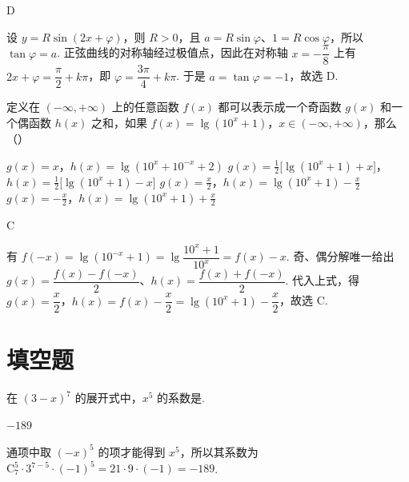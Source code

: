 \begin{answer}
D
\end{answer}

\begin{solution}
设 \(y=R\sin(2x+\varphi)\)，则 \(R>0\)，且 \(a=R\sin\varphi\)、\(1=R\cos\varphi\)，所以 \(\tan\varphi=a\). 正弦曲线的对称轴经过极值点，因此在对称轴 \(x=-\dfrac\pi8\) 上有 \(2x+\varphi=\dfrac\pi2+k\pi\)，即 \(\varphi=\dfrac{3\pi}{4}+k\pi\). 于是 \(a=\tan\varphi=-1\)，故选 D.
\end{solution}

\begin{problem}
定义在 \((- \infty, + \infty)\) 上的任意函数 \(f(x)\) 都可以表示成一个奇函数 \(g(x)\) 和一个偶函数 \(h(x)\) 之和，如果 \(f(x) = \lg (10^{x} + 1)\)，\(x \in (-\infty, +\infty)\)，那么（\quad）

\choices
    {\(g(x) = x\)，\(h(x) = \lg (10^{x} + 10^{-x} + 2)\)}
    {\(g(x) = \frac{1}{2}\bigl[\lg (10^{x} + 1) + x\bigr]\)，\(h(x) = \frac{1}{2}\bigl[\lg (10^{x} + 1) - x\bigr]\)}
    {\(g(x) = \frac{x}{2}\)，\(h(x) = \lg (10^x + 1) - \frac{x}{2}\)}
    {\(g(x) = -\frac{x}{2}\)，\(h(x) = \lg (10^x + 1) + \frac{x}{2}\)}
\end{problem}

\begin{answer}
C
\end{answer}

\begin{solution}
有 \(f(-x)=\lg(10^{-x}+1)=\lg\dfrac{10^x+1}{10^x}=f(x)-x\). 奇、偶分解唯一给出 \(g(x)=\dfrac{f(x)-f(-x)}2\)、\(h(x)=\dfrac{f(x)+f(-x)}2\). 代入上式，得 \(g(x)=\dfrac x2\)，\(h(x)=f(x)-\dfrac x2=\lg(10^x+1)-\dfrac x2\)，故选 C.
\end{solution}

\section{填空题}

\begin{problem}
在 \((3 - x)^7\) 的展开式中，\(x^5\) 的系数是\fillinblank{}.
\end{problem}

\begin{answer}
\(-189\)
\end{answer}

\begin{solution}
通项中取 \((-x)^5\) 的项才能得到 \(x^5\)，所以其系数为 \(\mathrm C_7^5\cdot3^{7-5}\cdot(-1)^5=21\cdot9\cdot(-1)=-189\).
\end{solution}

